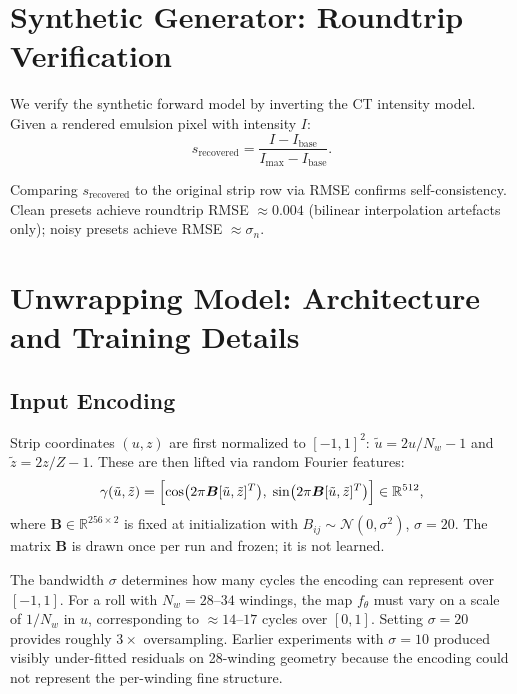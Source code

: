 \documentclass[11pt,a4paper]{article}
\newcommand{\R}{\mathbb{R}}
\begin{document}
\section{Synthetic Generator: Roundtrip Verification}
\label{app:roundtrip}

We verify the synthetic forward model by inverting the CT intensity model. Given a rendered emulsion pixel with intensity $I$:
\begin{equation}
    s_{\text{recovered}} = \frac{I - I_{\text{base}}}{I_{\max} - I_{\text{base}}}.
\end{equation}

Comparing $s_{\text{recovered}}$ to the original strip row via RMSE confirms self-consistency. Clean presets achieve roundtrip RMSE $\approx 0.004$ (bilinear interpolation artefacts only); noisy presets achieve RMSE $\approx \sigma_n$.

\section{Unwrapping Model: Architecture and Training Details}
\label{app:unwrap_arch}

\subsection{Input Encoding}

Strip coordinates $(u, z)$ are first normalized to $[-1, 1]^2$: $\tilde{u} = 2u/N_w - 1$ and $\tilde{z} = 2z/Z - 1$. These are then lifted via random Fourier features:
\begin{equation}
    \gamma(\tilde{u}, \tilde{z}) = \Bigl[\cos\bigl(2\pi \bm{B} [\tilde{u}, \tilde{z}]^T\bigr),\; \sin\bigl(2\pi \bm{B} [\tilde{u}, \tilde{z}]^T\bigr)\Bigr] \in \R^{512},
\end{equation}
where $\bm{B} \in \R^{256 \times 2}$ is fixed at initialization with $B_{ij} \sim \mathcal{N}(0, \sigma^2)$, $\sigma = 20$. The matrix $\bm{B}$ is drawn once per run and frozen; it is not learned.

The bandwidth $\sigma$ determines how many cycles the encoding can represent over $[-1,1]$. For a roll with $N_w = 28$--$34$ windings, the map $f_\theta$ must vary on a scale of $1/N_w$ in $u$, corresponding to $\approx 14$--$17$ cycles over $[0,1]$. Setting $\sigma = 20$ provides roughly $3\times$ oversampling. Earlier experiments with $\sigma = 10$ produced visibly under-fitted residuals on 28-winding geometry because the encoding could not represent the per-winding fine structure.
\end{document}

